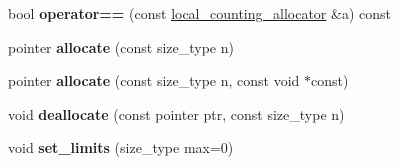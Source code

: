 \begin{DoxyCompactItemize}
\item 
\hypertarget{classlocal__counting__allocator_ab754c55002ff603a228119060abc90dd}{}bool {\bfseries operator==} (const \hyperlink{classlocal__counting__allocator}{local\+\_\+counting\+\_\+allocator} \&a) const \label{classlocal__counting__allocator_ab754c55002ff603a228119060abc90dd}

\item 
\hypertarget{classlocal__counting__allocator_adfa2210b129ac557b1986b6b8c7395ad}{}pointer {\bfseries allocate} (const size\+\_\+type n)\label{classlocal__counting__allocator_adfa2210b129ac557b1986b6b8c7395ad}

\item 
\hypertarget{classlocal__counting__allocator_aa68d138beef6413989aa38da236ae361}{}pointer {\bfseries allocate} (const size\+\_\+type n, const void $\ast$const)\label{classlocal__counting__allocator_aa68d138beef6413989aa38da236ae361}

\item 
\hypertarget{classlocal__counting__allocator_a8618fadaaebdb5e2fe105da3f0c872cc}{}void {\bfseries deallocate} (const pointer ptr, const size\+\_\+type n)\label{classlocal__counting__allocator_a8618fadaaebdb5e2fe105da3f0c872cc}

\item 
\hypertarget{classlocal__counting__allocator_a4c17b97b452bd11cda6fa6ff4d11a4bf}{}void {\bfseries set\+\_\+limits} (size\+\_\+type max=0)\label{classlocal__counting__allocator_a4c17b97b452bd11cda6fa6ff4d11a4bf}

\end{DoxyCompactItemize}
